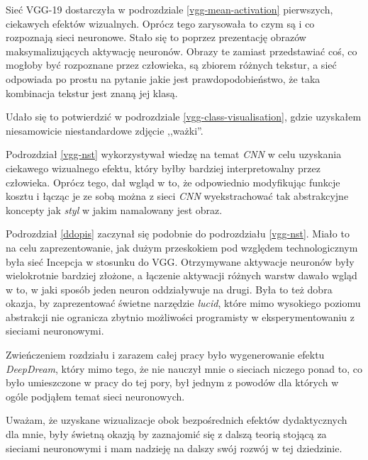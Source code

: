 Sieć VGG-19 dostarczyła w podrozdziale \ref{vgg-mean-activation} pierwszych, ciekawych efektów wizualnych. Oprócz tego zarysowała to czym są i co rozpoznają sieci neuronowe. Stało się to poprzez prezentację obrazów maksymalizujących aktywację neuronów. Obrazy te zamiast przedstawiać coś, co mogłoby być rozpoznane przez człowieka, są zbiorem różnych tekstur, a sieć odpowiada po prostu na pytanie jakie jest prawdopodobieństwo, że taka kombinacja tekstur jest znaną jej klasą.

Udało się to potwierdzić w podrozdziale \ref{vgg-class-visualisation}, gdzie uzyskałem niesamowicie niestandardowe zdjęcie ,,ważki''. 

Podrozdział \ref{vgg-nst} wykorzystywał wiedzę na temat \textit{CNN} w celu uzyskania ciekawego wizualnego efektu, który byłby bardziej interpretowalny przez człowieka. Oprócz tego, dał wgląd w to, że odpowiednio modyfikując funkcje kosztu i łącząc je ze sobą można z sieci \textit{CNN} wyekstrachować tak abstrakcyjne koncepty jak \textit{styl} w jakim namalowany jest obraz.

Podrozdział \ref{ddopis} zaczynał się podobnie do podrozdziału \ref{vgg-nst}. Miało to na celu zaprezentowanie, jak dużym przeskokiem pod względem technologicznym była sieć Incepcja w stosunku do VGG. Otrzymywane aktywacje neuronów były wielokrotnie bardziej złożone, a łączenie aktywacji różnych warstw dawało wgląd w to, w jaki sposób jeden neuron oddziaływuje na drugi. Była to też dobra okazja, by zaprezentować świetne narzędzie \textit{lucid}, które mimo wysokiego poziomu abstrakcji nie
ogranicza zbytnio możliwości programisty w eksperymentowaniu z sieciami neuronowymi.

Zwieńczeniem rozdziału i zarazem całej pracy było wygenerowanie efektu \textit{DeepDream}, który mimo tego, że nie nauczył mnie o sieciach niczego ponad to, co było umieszczone w pracy do tej pory, był jednym z powodów dla których w ogóle podjąłem temat sieci neuronowych.

Uważam, że uzyskane wizualizacje obok bezpośrednich efektów dydaktycznych dla mnie, były świetną okazją by zaznajomić się z dalszą teorią stojącą za sieciami neuronowymi i mam nadzieję na dalszy swój rozwój w tej dziedzinie.
